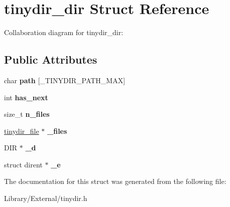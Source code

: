 \hypertarget{structtinydir__dir}{}\section{tinydir\+\_\+dir Struct Reference}
\label{structtinydir__dir}


Collaboration diagram for tinydir\+\_\+dir\+:
\subsection*{Public Attributes}
\begin{DoxyCompactItemize}
\item 
\hypertarget{structtinydir__dir_a680e146c5cad2c591c658ce65c01f204}{}char {\bfseries path} \mbox{[}\+\_\+\+T\+I\+N\+Y\+D\+I\+R\+\_\+\+P\+A\+T\+H\+\_\+\+M\+A\+X\mbox{]}\label{structtinydir__dir_a680e146c5cad2c591c658ce65c01f204}

\item 
\hypertarget{structtinydir__dir_a199eae7f7fa402e1c3f5195de9beb15b}{}int {\bfseries has\+\_\+next}\label{structtinydir__dir_a199eae7f7fa402e1c3f5195de9beb15b}

\item 
\hypertarget{structtinydir__dir_afcb78c8c7847fd984faf7cbb16cf9768}{}size\+\_\+t {\bfseries n\+\_\+files}\label{structtinydir__dir_afcb78c8c7847fd984faf7cbb16cf9768}

\item 
\hypertarget{structtinydir__dir_aa410f654a220b8dbe75f492b0285594b}{}\hyperlink{structtinydir__file}{tinydir\+\_\+file} $\ast$ {\bfseries \+\_\+files}\label{structtinydir__dir_aa410f654a220b8dbe75f492b0285594b}

\item 
\hypertarget{structtinydir__dir_af79657e3152541d6cb3953f0d2d16e22}{}D\+I\+R $\ast$ {\bfseries \+\_\+d}\label{structtinydir__dir_af79657e3152541d6cb3953f0d2d16e22}

\item 
\hypertarget{structtinydir__dir_afb1d54c34055f8feb5c1079482417db1}{}struct dirent $\ast$ {\bfseries \+\_\+e}\label{structtinydir__dir_afb1d54c34055f8feb5c1079482417db1}

\end{DoxyCompactItemize}


The documentation for this struct was generated from the following file\+:\begin{DoxyCompactItemize}
\item 
Library/\+External/tinydir.\+h\end{DoxyCompactItemize}
